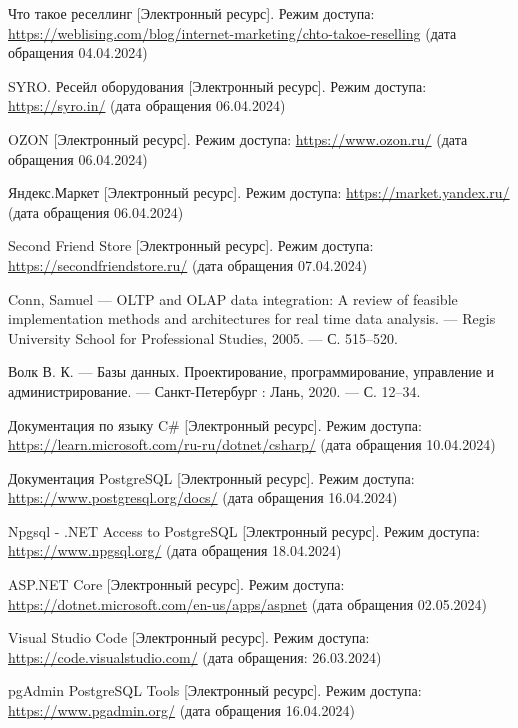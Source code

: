 \renewcommand\bibname{\large\bfseries\hfill{\centering СПИСОК ИСПОЛЬЗОВАННЫХ ИСТОЧНИКОВ}\hfill}
\begin{thebibliography}{}
	
	 Что такое реселлинг [Электронный ресурс]. Режим доступа: \url{https://weblising.com/blog/internet-marketing/chto-takoe-reselling} (дата обращения 04.04.2024)
	
	 SYRO. Ресейл оборудования [Электронный ресурс]. Режим доступа: \url{https://syro.in/} (дата обращения 06.04.2024)
	
	 OZON [Электронный ресурс]. Режим доступа: \url{https://www.ozon.ru/} (дата обращения 06.04.2024)
	
	 Яндекс.Маркет [Электронный ресурс]. Режим доступа: \url{https://market.yandex.ru/} (дата обращения 06.04.2024)
	
	 Second Friend Store [Электронный ресурс]. Режим доступа: \url{https://secondfriendstore.ru/} (дата обращения 07.04.2024)

	 Conn, Samuel --- OLTP and OLAP data integration: A review of feasible implementation methods and architectures for real time data analysis. --- Regis University School for Professional Studies, 2005. --- С. 515--520.
	
	 Волк В. К. --- Базы данных. Проектирование, программирование, управление и администрирование.	--- Санкт-Петербург : Лань, 2020. --- С. 12--34.
	
	 Документация по языку C\# [Электронный ресурс]. Режим доступа: \url{https://learn.microsoft.com/ru-ru/dotnet/csharp/} (дата обращения 10.04.2024)
	
	 Документация PostgreSQL [Электронный ресурс]. Режим доступа: \url{https://www.postgresql.org/docs/} (дата обращения 16.04.2024)
	
	 Npgsql - .NET Access to PostgreSQL [Электронный ресурс]. Режим доступа: \url{https://www.npgsql.org/} (дата обращения 18.04.2024)
	
	 ASP.NET Core [Электронный ресурс]. Режим доступа: \url{https://dotnet.microsoft.com/en-us/apps/aspnet} (дата обращения 02.05.2024)
	
	 Visual Studio Code [Электронный ресурс]. Режим доступа: \url{https://code.visualstudio.com/} (дата обращения: 26.03.2024)
	
	 pgAdmin PostgreSQL Tools [Электронный ресурс]. Режим доступа: \url{https://www.pgadmin.org/} (дата обращения 16.04.2024)
	
\end{thebibliography}
